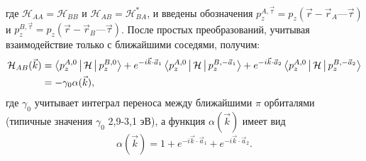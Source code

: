 где \(\mathcal{H}_{AA}=\mathcal{H}_{BB}\) и \(\mathcal{H}_{AB}=\mathcal{H}_{BA}^*\), и введены обозначения \(p_z^{A,\vec{\tau}} = p_z(\vec{r} - \vec{r}_A — \vec{\tau})\) и \(p_z^{B,\vec{\tau}} = p_z(\vec{r} - \vec{r}_B — \vec{\tau})\). После простых преобразований, учитывая взаимодействие только с ближайшими соседями, получим:
\begin{align*}
    \mathcal{H}_{AB}(\vec{k}) & = \Braket{p_z^{A,0}|\mathcal{H}|p_z^{B,0}} + e^{-i\vec{k}\cdot\vec{a}_1}\Braket{p_z^{A,0}|\mathcal{H}|p_z^{B,-\vec{a}_1}} + e^{-i\vec{k}\cdot\vec{a}_2}\Braket{p_z^{A,0}|\mathcal{H}|p_z^{B,-\vec{a}_2}}\\
    & = -\gamma_0\alpha(\vec{k}),
\end{align*}
где \(\gamma_0\) учитывает интеграл переноса между ближайшими \(\pi\) орбиталями (типичные значения \(\gamma_0\) 2,9-3,1 эВ), а функция \(\alpha(\vec{k})\) имеет вид
\[
    \alpha(\vec{k}) = 1 + e^{-i\vec{k}\cdot\vec{a}_1} + e^{-i\vec{k}\cdot\vec{a}_2}.
\]

